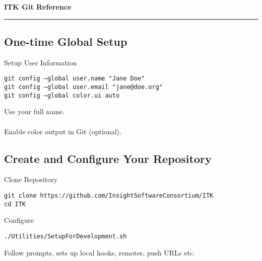 \documentclass[10pt]{article}
\newlength{\cvsep}
\newlength{\cvtitles}
\newlength{\cvmain}
\newenvironment{category}[1]
  {\parbox[t]{\cvtitles}{\large\sc\centering #1}\hspace*{\cvsep}\begin{minipage}[t]{\cvmain}}
  {\end{minipage}\vspace*{0.35cm}}
\begin{document}
\pagestyle{empty}

{\centering
  \huge \bf ITK Git Reference
  \vspace*{0.1cm}
  \hrule
}
\vspace*{0.3cm}

\subsection*{One-time Global Setup}
\begin{category}{Setup User Information}
\parbox[t]{0.6\cvmain}{%
\texttt{git config --global user.name "Jane Doe"\\
git config --global user.email "jane@doe.org"\\
git config --global color.ui auto}}
\parbox[t]{0.38\cvmain}{%
Use your full name.\\
\\
Enable color output in Git (optional).
}
\end{category}

\subsection*{Create and Configure Your Repository}
\begin{category}{Clone Repository}
\parbox[t]{0.6\cvmain}{%
  \texttt{git clone https://github.com/InsightSoftwareConsortium/ITK\\ cd ITK}
}
\parbox[t]{0.38\cvmain}{%
}
\end{category}
\begin{category}{Configure}
\parbox[t]{0.6\cvmain}{%
  \texttt{./Utilities/SetupForDevelopment.sh}
}
\parbox[t]{0.38\cvmain}{%
Follow prompts, sets up local hooks, remotes, push URLs etc.
}
\end{category}
\end{document}
